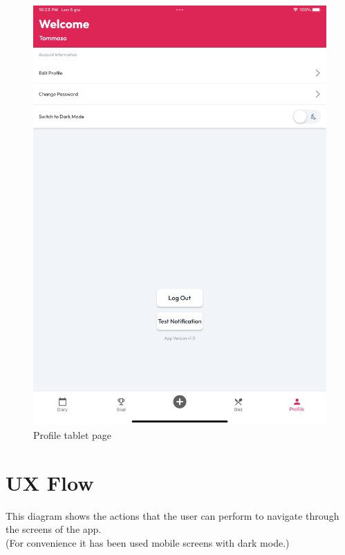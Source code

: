 \documentclass{Configuration_Files/PoliMi3i_thesis}
\begin{document}
\begin{figure}[!h]
  \includegraphics[scale=0.1]{Images/Screenshots/Tablet/ProfileTabletLight.png}
  \caption{Profile tablet page}
\end{figure}

\clearpage

\section{UX Flow}

\begin{minipage}{\linewidth}
    This diagram shows the actions that the user can perform to navigate through the screens of the app. \\
    (For convenience it has been used mobile screens with dark mode.)
\end{minipage}
\end{document}
